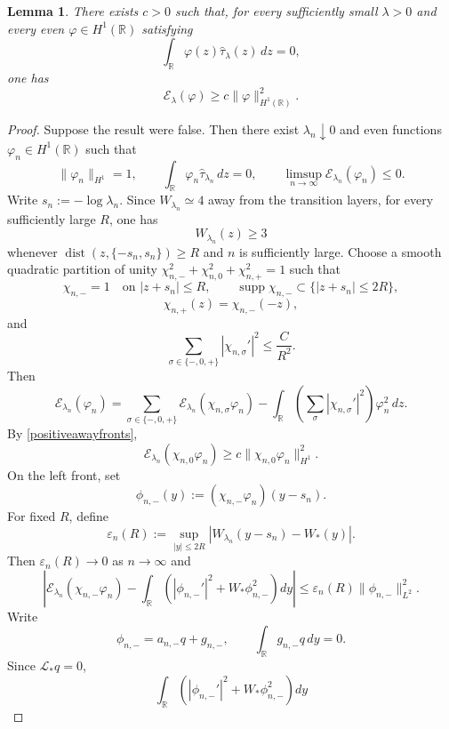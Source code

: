 \documentclass[11pt,a4paper]{article}
\numberwithin{equation}{section}
\theoremstyle{plain}
\newtheorem{lemma}[theorem]{Lemma}
\theoremstyle{remark}
\begin{document}
\begin{lemma}
\label{twofrontunweightedlem}
There exists $c>0$ such that, for every sufficiently small
$\lambda>0$ and every even
$\varphi\in H^1(\mathbb R)$ satisfying
$$
\int_{\mathbb R}\varphi(z)\widehat{\tau}_\lambda(z)\,dz=0,
$$
one has
\begin{equation}
\mathcal E_\lambda(\varphi)
\geq
c\|\varphi\|_{H^1(\mathbb R)}^2.
\end{equation}
\end{lemma}
\begin{proof}
Suppose the result were false. Then there exist
$\lambda_n\downarrow0$ and even functions $\varphi_n\in H^1(\mathbb R)$
such that
$$
\|\varphi_n\|_{H^1}=1,
\qquad
\int_{\mathbb R}\varphi_n\widehat{\tau}_{\lambda_n}\,dz=0,
\qquad
\limsup_{n\to\infty}\mathcal E_{\lambda_n}(\varphi_n)\leq0.
$$
Write $s_n:=-\log\lambda_n$. Since $W_{\lambda_n}\simeq 4$ away from the transition layers, for every sufficiently large $R$, one has
\begin{equation}\label{positiveawayfronts}
W_{\lambda_n}(z)\geq3
\end{equation}
whenever $\operatorname{dist}(z,\{-s_n,s_n\})\geq R$ and $n$ is sufficiently large.
Choose a smooth quadratic partition of unity $\chi_{n,-}^2+\chi_{n,0}^2+\chi_{n,+}^2=1$ such that
$$
\chi_{n,-}=1
\quad\text{on }|z+s_n|\leq R,
\qquad
\operatorname{supp}\chi_{n,-}
\subset
\{|z+s_n|\leq2R\},
$$
$$
\chi_{n,+}(z)=\chi_{n,-}(-z),
$$
and
$$
\sum_{\sigma\in\{-,0,+\}}
|\chi_{n,\sigma}'|^2
\leq
\frac{C}{R^2}.
$$
Then
\begin{equation}\label{twofrontIMS}
\mathcal E_{\lambda_n}(\varphi_n)
=
\sum_{\sigma\in\{-,0,+\}}
\mathcal E_{\lambda_n}(\chi_{n,\sigma}\varphi_n)
-
\int_{\mathbb R}
\left(
\sum_\sigma|\chi_{n,\sigma}'|^2
\right)\varphi_n^2\,dz.
\end{equation}
By \eqref{positiveawayfronts},
$$
\mathcal E_{\lambda_n}(\chi_{n,0}\varphi_n)
\geq
c\|\chi_{n,0}\varphi_n\|_{H^1}^2.
$$
On the left front, set
$$
\phi_{n,-}(y)
:=
(\chi_{n,-}\varphi_n)(y-s_n).
$$
For fixed $R$, define
$$
\varepsilon_n(R)
:=
\sup_{|y|\leq2R}
\left|
W_{\lambda_n}(y-s_n)-W_*(y)
\right|.
$$
Then $\varepsilon_n(R)\longrightarrow0$ as $n\to\infty$ and
$$
\left|
\mathcal E_{\lambda_n}(\chi_{n,-}\varphi_n)
-
\int_{\mathbb R}
\left(
|\phi_{n,-}'|^2+W_*\phi_{n,-}^2
\right)dy
\right|
\leq
\varepsilon_n(R)\|\phi_{n,-}\|_{L^2}^2.
$$
Write
$$
\phi_{n,-}=a_{n,-}q+g_{n,-},
\qquad
\int_{\mathbb R}g_{n,-}q\,dy=0.
$$
Since $\mathscr L_*q=0$,
$$
\int_{\mathbb R}
\left(
|\phi_{n,-}'|^2+W_*\phi_{n,-}^2
\right)dy
$$
\end{proof}
\end{document}
